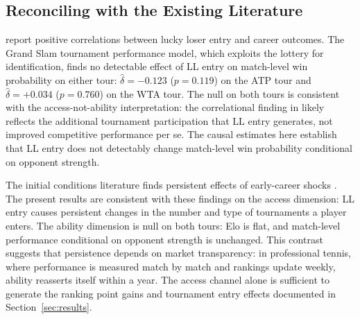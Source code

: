 \subsection{Reconciling with the Existing Literature}
\label{sec:mechanisms_reconciling}

\citet{Maity2025_early_career_sports} report positive correlations between lucky loser entry and career outcomes. The Grand Slam tournament performance model, which exploits the lottery for identification, finds no detectable effect of LL entry on match-level win probability on either tour: $\hat{\delta} = -0.123$ ($p = 0.119$) on the ATP tour and $\hat{\delta} = +0.034$ ($p = 0.760$) on the WTA tour. The null on both tours is consistent with the access-not-ability interpretation: the correlational finding in \citet{Maity2025_early_career_sports} likely reflects the additional tournament participation that LL entry generates, not improved competitive performance per se. The causal estimates here establish that LL entry does not detectably change match-level win probability conditional on opponent strength.

The initial conditions literature finds persistent effects of early-career shocks \citep{Oyer2006_initial_placement, Oreopoulos2012_graduating_recession}. The present results are consistent with these findings on the access dimension: LL entry causes persistent changes in the number and type of tournaments a player enters. The ability dimension is null on both tours: Elo is flat, and match-level performance conditional on opponent strength is unchanged. This contrast suggests that persistence depends on market transparency: in professional tennis, where performance is measured match by match and rankings update weekly, ability reasserts itself within a year. The access channel alone is sufficient to generate the ranking point gains and tournament entry effects documented in Section~\ref{sec:results}.
